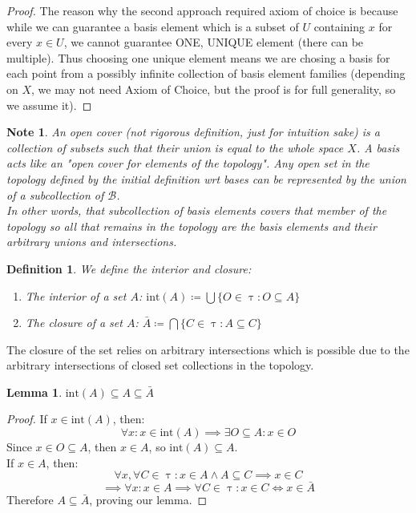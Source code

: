 \documentclass{article}
\newtheorem{lem}{Lemma}[section]
\newtheorem{defn}{Definition}[section]
\newtheorem{note}{Note}[section]
\begin{document}
\begin{proof}
The reason why the second approach required axiom of choice is because while we can guarantee a basis element which is a subset of $U$ containing $x$ for every $x \in U$, we cannot guarantee ONE, UNIQUE element (there can be multiple). Thus choosing one unique element means we are chosing a basis for each point from a possibly infinite collection of basis element families (depending on $X$, we may not need Axiom of Choice, but the proof is for full generality, so we assume it).
\end{proof}
\begin{note}
An open cover (not rigorous definition, just for intuition sake) is a collection of subsets such that their union is equal to the whole space $X$. A basis acts like an "open cover for elements of the topology". Any open set in the topology defined by the initial definition wrt bases can be represented by the union of a subcollection of $\mathcal{B}$.\\

In other words, that subcollection of basis elements covers that member of the topology so all that remains in the topology are the basis elements and their arbitrary unions and intersections.
\end{note}

\medskip
\begin{defn} We define the interior and closure:
    \begin{enumerate}
        \item The interior of a set $A$: $\text{int}(A) \coloneq \bigcup \{O \in \uptau: O \subseteq A\}$
        \item The closure of a set $A$: $\bar{A} \coloneq \bigcap \{C \in \uptau: A \subseteq C\}$
    \end{enumerate}
\end{defn}
The closure of the set relies on arbitrary intersections which is possible due to the arbitrary intersections of
closed set collections in the topology.

\medskip
\begin{lem}
    $\text{int}(A) \subseteq A \subseteq \bar{A}$
\end{lem}
\begin{proof}
If $x \in \text{int}(A)$, then:
\begin{equation*}
    \forall x: x \in \text{int}(A) \implies \exists O \subseteq A: x \in O
\end{equation*}
Since $x \in O \subseteq A$, then $x \in A$, so $\text{int}(A) \subseteq A$.\\

If $x \in A$, then:
\begin{equation*}
    \forall x, \forall C \in \uptau: x \in A \land A \subseteq C \implies x \in C
\end{equation*}
\begin{equation*}
    \implies \forall x: x \in A \implies \forall C \in \uptau: x \in C \iff x \in \bar{A}
\end{equation*}
Therefore $A \subseteq \bar{A}$, proving our lemma.
\end{proof}
\end{document}
